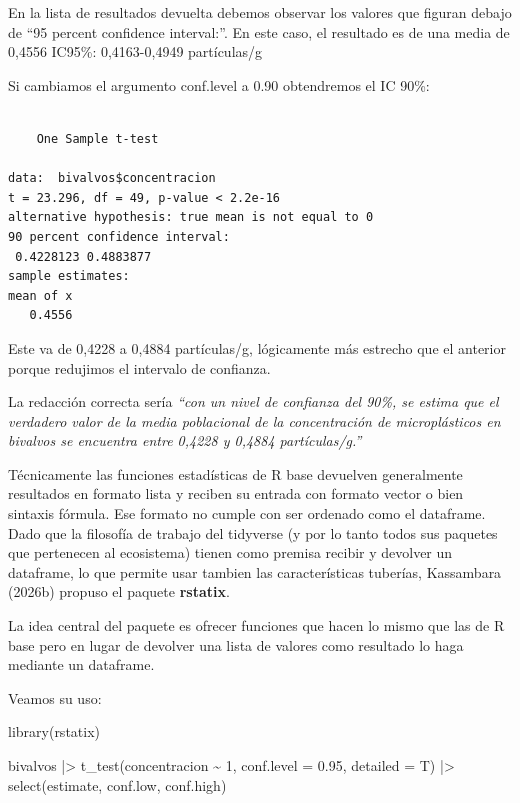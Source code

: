 \documentclass[
  spanish,
  a4paper,
]{scrbook}
\newenvironment{Shaded}{\begin{snugshade}}{\end{snugshade}}
\newcommand{\AttributeTok}[1]{\textcolor[rgb]{0.40,0.45,0.13}{#1}}
\newcommand{\DecValTok}[1]{\textcolor[rgb]{0.68,0.00,0.00}{#1}}
\newcommand{\FloatTok}[1]{\textcolor[rgb]{0.68,0.00,0.00}{#1}}
\newcommand{\FunctionTok}[1]{\textcolor[rgb]{0.28,0.35,0.67}{#1}}
\newcommand{\NormalTok}[1]{\textcolor[rgb]{0.00,0.23,0.31}{#1}}
\newcommand{\SpecialCharTok}[1]{\textcolor[rgb]{0.37,0.37,0.37}{#1}}
\begin{document}
En la lista de resultados devuelta debemos observar los valores que
figuran debajo de ``95 percent confidence interval:''. En este caso, el
resultado es de una media de 0,4556 IC95\%: 0,4163-0,4949 partículas/g

Si cambiamos el argumento conf.level a 0.90 obtendremos el IC 90\%:

\begin{Shaded}
\end{Shaded}

\begin{verbatim}

    One Sample t-test

data:  bivalvos$concentracion
t = 23.296, df = 49, p-value < 2.2e-16
alternative hypothesis: true mean is not equal to 0
90 percent confidence interval:
 0.4228123 0.4883877
sample estimates:
mean of x 
   0.4556 
\end{verbatim}

Este va de 0,4228 a 0,4884 partículas/g, lógicamente más estrecho que el
anterior porque redujimos el intervalo de confianza.

La redacción correcta sería \emph{``con un nivel de confianza del 90\%,
se estima que el verdadero valor de la media poblacional de la
concentración de microplásticos en bivalvos se encuentra entre 0,4228 y
0,4884 partículas/g.''}

Técnicamente las funciones estadísticas de R base devuelven generalmente
resultados en formato lista y reciben su entrada con formato vector o
bien sintaxis fórmula. Ese formato no cumple con ser ordenado como el
dataframe. Dado que la filosofía de trabajo del tidyverse (y por lo
tanto todos sus paquetes que pertenecen al ecosistema) tienen como
premisa recibir y devolver un dataframe, lo que permite usar tambien las
características tuberías, Kassambara (2026b) propuso el paquete
\textbf{rstatix}.

La idea central del paquete es ofrecer funciones que hacen lo mismo que
las de R base pero en lugar de devolver una lista de valores como
resultado lo haga mediante un dataframe.

Veamos su uso:

\begin{Shaded}
\begin{Highlighting}[]
\FunctionTok{library}\NormalTok{(rstatix)}

\NormalTok{bivalvos }\SpecialCharTok{|\textgreater{}}
  \FunctionTok{t\_test}\NormalTok{(concentracion }\SpecialCharTok{\textasciitilde{}} \DecValTok{1}\NormalTok{, }\AttributeTok{conf.level =} \FloatTok{0.95}\NormalTok{, }\AttributeTok{detailed =}\NormalTok{ T) }\SpecialCharTok{|\textgreater{}}
  \FunctionTok{select}\NormalTok{(estimate, conf.low, conf.high)}
\end{Highlighting}
\end{Shaded}
\end{document}

